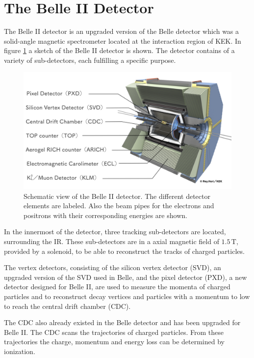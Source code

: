 \documentclass[a4paper,11pt,twosided,final,german,openbib,pdftex,listof=totoc,bibliography=totoc]{scrbook}
\begin{document}
\section{The Belle II Detector}
\label{sec:BelleII}

The Belle II detector is an upgraded version of the Belle detector which was a solid-angle magnetic spectrometer located at the interaction region of KEK. In figure  \ref{fig:Belle2} a sketch of the Belle II detector is shown. The detector contains of a variety of sub-detectors, each fulfilling a specific purpose.
 
\begin{figure}[h!]
	\centering
	\includegraphics[width=\textwidth]{Bilder/Belle2.png}
	
	\caption[Belle II Detector]{Schematic view of the Belle II detector. The different detector elements are labeled. Also the beam pipes for the electrons and positrons with their corresponding energies are shown. \cite{BDetector}}
	\label{fig:Belle2}
\end{figure}

 In the innermost of the detector, three tracking sub-detectors are located, surrounding the IR. These sub-detectors are in a axial magnetic field of $1.5\,\textrm{T}$, provided by a solenoid, to be able to reconstruct the tracks of charged particles. 
 
 The vertex detectors, consisting of the silicon vertex detector (SVD), an upgraded version of the SVD used in Belle, and the pixel detector (PXD), a new detector designed for Belle II, are used to measure the momenta of charged particles and to reconstruct decay vertices and particles with a momentum to low to reach the central drift chamber (CDC).

The CDC also already existed in the Belle detector and has been upgraded for Belle II. The CDC scans the trajectories of charged particles. From these trajectories the charge, momentum and energy loss can be determined by ionization. 
\end{document}
